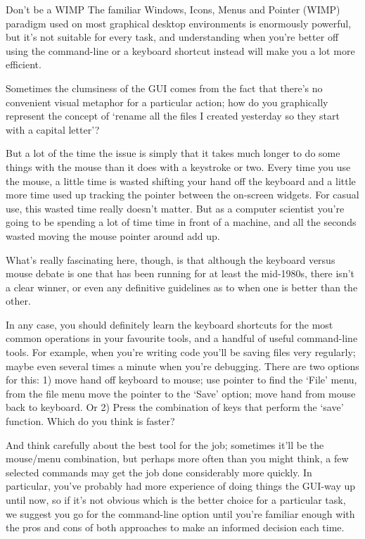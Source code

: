 \begin{diversion}{Don't be a WIMP}
The familiar Windows, Icons, Menus and Pointer (WIMP) paradigm used on most graphical desktop environments is enormously powerful, but it's not suitable for every task, and understanding when you're better off using the command-line or a keyboard shortcut instead will make you a lot more efficient.

Sometimes the clumsiness of the GUI comes from the fact that there's no convenient visual metaphor for a particular action; how do you graphically represent the concept of `rename all the files I created yesterday so they start with a capital letter'? 

But a lot of the time the issue is simply that it takes much longer to do some things with the mouse than it does with a keystroke or two. Every time you use the mouse, a little time is wasted shifting your hand off the keyboard and a little more time used up tracking the pointer between the on-screen widgets. For casual use, this wasted time really doesn't matter. But as a computer scientist you're going to be spending a lot of time time in front of a machine, and all the seconds wasted moving the mouse pointer around add up. 

What's really fascinating here, though, is that although the keyboard versus mouse debate is one that has been running for at least the mid-1980s, there isn't a clear winner, or even any definitive guidelines as to when one is better than the other. 

In any case, you should definitely learn the keyboard shortcuts for the most common operations in your favourite tools, and a handful of useful command-line tools. For example, when you're writing code you'll be saving files very regularly; maybe even several times a minute when you're debugging. There are two options for this: 1) move hand off keyboard to mouse; use pointer to find the `File' menu, from the file menu move the pointer to the `Save' option; move hand from mouse back to keyboard. Or 2) Press the combination of keys that perform the `save' function. Which do you think is faster?

And think carefully about the best tool for the job; sometimes it'll be the mouse/menu combination, but perhaps more often than you might think, a few selected commands may get the job done considerably more quickly. In particular, you've probably had more experience of doing things the GUI-way up until now, so if it's not obvious which is the better choice for a particular task, we suggest you go for the command-line option until you're familiar enough with the pros and cons of both approaches to make an informed decision each time.
\end{diversion}

